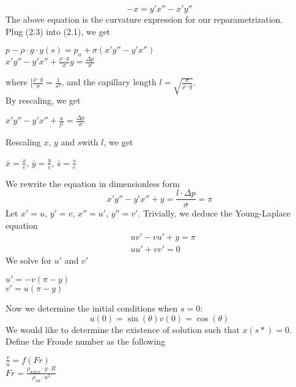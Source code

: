 \documentclass{jfm}
\begin{document}
\begin{equation}
-x=y'x''-x'y''
\end{equation}
The above equation is the curvature expression for our reparametrization.\\
Plug (2.3) into (2.1), we get\\
\begin{center}
$p-\rho\cdot{g}\cdot{y(s)}=p_{a}+\sigma(x'y''-y'x'')$\\
$x'y''-y'x''+\frac{\rho\cdot{g}}{\sigma}y=\frac{\Delta{p}}{\sigma}$
\end{center}
where $[\frac{\rho\cdot{g}}{\sigma}=\frac{1}{s^2}$, and the capillary length $l=\sqrt{\frac{\sigma}{\rho\cdot{g}}}$.\\
By rescaling, we get\\
\begin{center}
$x'y''-y'x''+\frac{u}{l^2}=\frac{\Delta{p}}{\sigma}$
\end{center}
Rescaling $x$, $y$ and $s$with $l$, we get\\
\begin{center}
$\bar{x}=\frac{x}{e}$, $\bar{y}=\frac{y}{e}$, $\bar{s}=\frac{s}{e}$
\end{center}
We rewrite the equation in dimensionless form\\
\begin{equation}
x'y''-y'x''+y=\frac{l\cdot{\Delta{p}}}{\sigma}=\pi
\end{equation}
Let $x'=u$, $y'=v$, $x''=u'$, $y''=v'$. Trivially, we deduce the Young-Laplace equation\\
\begin{equation}
\begin{aligned}
&uv'-vu'+y=\pi \\
&uu'+vv'=0
\end{aligned}
\end{equation}
We solve for $u'$ and $v'$\\
\begin{center}
$u'=-v(\pi-y)$\\
$v'=u(\pi-y)$
\end{center}
Now we determine the initial conditions when $s=0$:\\
\begin{equation}
u(0)=\sin(\theta)
v(0)=\cos(\theta)
\end{equation}
We would like to determine the existence of solution such that $x(s*)=0$.\\
Define the Froude number as the following\\
\begin{center}
$\frac{v}{u}=f(Fr)$\\
$Fr=\frac{\rho_{\text{water}}\cdot{g}\cdot{R}}{\rho_{\text{air}}\cdot{u^2}}$
\end{center}
\end{document}
